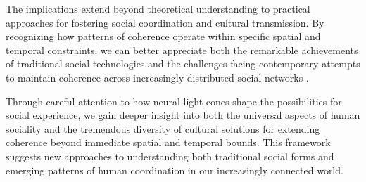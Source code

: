 The implications extend beyond theoretical understanding to practical approaches for fostering social coordination and cultural transmission. By recognizing how patterns of coherence operate within specific spatial and temporal constraints, we can better appreciate both the remarkable achievements of traditional social technologies and the challenges facing contemporary attempts to maintain coherence across increasingly distributed social networks \cite{hutchins1995cognition}.

Through careful attention to how neural light cones shape the possibilities for social experience, we gain deeper insight into both the universal aspects of human sociality and the tremendous diversity of cultural solutions for extending coherence beyond immediate spatial and temporal bounds. This framework suggests new approaches to understanding both traditional social forms and emerging patterns of human coordination in our increasingly connected world.